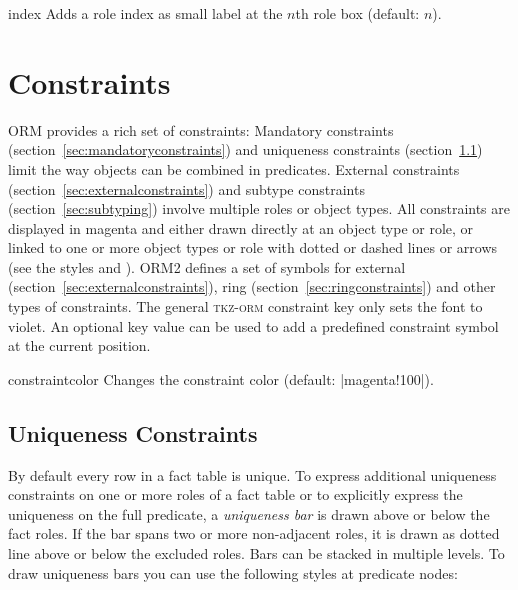 \documentclass[a4paper,10pt]{article}
\begin{document}
\begin{stylekey}{index}
Adds a role index as small label at the $n$th role box (default: $n$).
\begin{codeexample}[]
\end{codeexample}
\end{stylekey}


\section{Constraints}
\label{sec:constraints}
ORM provides a rich set of constraints: Mandatory constraints (section~\ref{sec:mandatoryconstraints}) and uniqueness constraints (section~\ref{sec:uniquenessconstraints}) limit the way objects can be combined in predicates. External constraints (section~\ref{sec:externalconstraints}) and subtype constraints (section~\ref{sec:subtyping}) involve multiple roles or object types. All constraints are displayed in magenta and either drawn directly at an object type or role, or linked to one or more object types or role with dotted or dashed lines or arrows (see the styles  and ). ORM2 defines a set of symbols for external (section~\ref{sec:externalconstraints}), ring (section~\ref{sec:ringconstraints}) and other types of constraints. The general \textsc{tkz-orm} constraint key  only sets the font to violet. An optional key value can be used to add a predefined constraint symbol at the current position.

\begin{stylekey}{constraintcolor}
Changes the constraint color (default: |magenta!100|).
\end{stylekey}

\subsection{Uniqueness Constraints}
\label{sec:uniquenessconstraints}
By default every row in a fact table is unique. To express additional uniqueness constraints on one or more roles of a fact table or to explicitly express the uniqueness on the full predicate, a \emph{uniqueness bar} is drawn above or below the fact roles. If the bar spans two or more non-adjacent roles, it is drawn as dotted line above or below the excluded roles. Bars can be stacked in multiple levels. To draw uniqueness bars you can use the following styles at predicate nodes:
\end{document}
